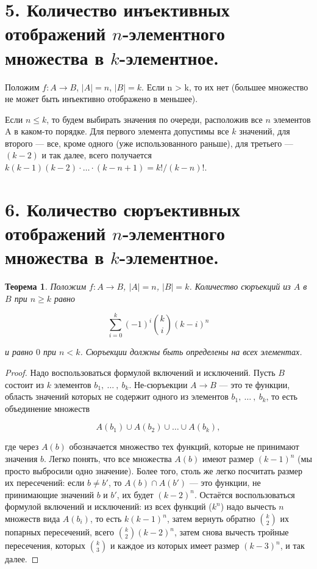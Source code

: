 \documentclass[a4paper, 12pt]{article}
\newtheorem*{theorem}{Теорема}
\begin{document}
\section*{5. Количество инъективных отображений $n$-элементного множества в $k$-элементное.}

Положим $f : A \to B$, $|A| = n$, $|B| = k$. Если n > k, то их нет (большее множество не может быть инъективно отображено в меньшее).

Если $n \leq k$, то будем выбирать значения по очереди, расположив все $n$ элементов A в каком-то порядке. Для первого элемента допустимы все $k$ значений, для второго — все, кроме одного (уже использованного раньше), для третьего — $(k - 2)$ и так далее, всего получается $k(k - 1)(k - 2) \cdot \ldots \cdot (k - n + 1) = k!/(k - n)!$.

\section*{6. Количество сюръективных отображений $n$-элементного множества в $k$-элементное.}

\begin{theorem}

Положим $f : A \to B$, $|A| = n$, $|B| = k$. Количество сюръекций из $A$ в $B$ при $n \geq k$ равно

\[
    \sum\limits_{i = 0}^{k}(-1)^i {k \choose i} (k - i)^n
\]

и равно $0$ при $n < k$. Сюръекции должны быть определены на всех элементах.

\end{theorem}

\begin{proof}

Надо воспользоваться формулой включений и исключений. Пусть $B$ состоит из $k$ элементов $b_1,\ \ldots\ ,\ b_k$. Не-сюръекции $A \to B$ — это те функции, область значений которых не содержит одного из элементов $b_1,\ \ldots\ ,\ b_k$, то есть объединение множеств

\[
    A(b_1) \cup A(b_2) \cup \ldots \cup A(b_k),
\]

где через $A(b)$ обозначается множество тех функций, которые не принимают значения $b$. Легко понять, что все множества $A(b)$ имеют размер $(k - 1)^n$ (мы просто выбросили одно значение). Более того, столь же легко посчитать размер их пересечений: если $b \neq b'$, то $A(b) \cap A(b')$ — это функции, не принимающие значений $b$ и $b'$, их будет $(k - 2)^n$. Остаётся воспользоваться формулой включений и исключений: из всех функций ($k^n$) надо вычесть $n$ множеств вида $A(b_i)$, то есть $k(k - 1)^n$, затем вернуть обратно $k \choose 2$ их попарных пересечений, всего ${k \choose 2}(k - 2)^n$, затем снова вычесть тройные пересечения, которых ${k \choose 3}$ и каждое из которых имеет размер $(k - 3)^n$, и так далее.

\end{proof}
\end{document}
